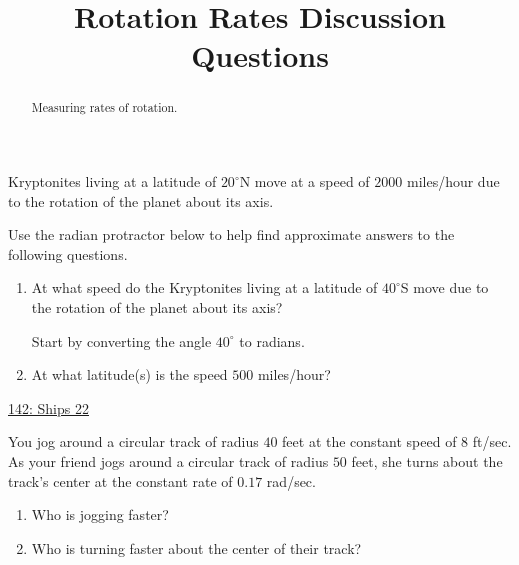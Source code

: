 \documentclass{ximera}
\title{Rotation Rates Discussion Questions}
\begin{document}
\begin{abstract}
Measuring rates of rotation.
\end{abstract}
\maketitle



\begin{question} \label{Q6721:Angles}
Kryptonites living at a latitude of $20^\circ$N move at a speed of $2000$ miles/hour due to the rotation of the planet about its axis.

Use the radian protractor below to help find approximate answers to the following questions.

\begin{enumerate}
\item  At what speed do the Kryptonites living at a latitude of $40^\circ$S move due to the rotation of the planet about its axis?
\begin{hint}
Start by converting the angle $40^\circ$ to radians.
\end{hint}

\item At what latitude(s) is the speed $500$ miles/hour?





\end{enumerate}


\begin{onlineOnly}
    \begin{center}
\end{center}
\end{onlineOnly}

\href{https://www.desmos.com/calculator/fmjbqszyge}{142: Ships 22}

\end{question}




\begin{question} \label{Qldsfsda4trgfvbvb}
You jog around a circular track of radius $40$ feet at the constant speed of $8$ ft/sec. As your friend jogs around a circular track of radius $50$ feet, she turns about the track's center at the constant rate of $0.17$ rad/sec.

\begin{enumerate}
\item Who is jogging faster?

\item Who is turning faster about the center of their track? 

\end{enumerate}
\end{question}
\end{document}
